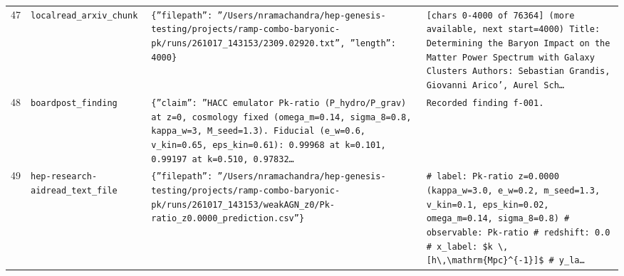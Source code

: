 \documentclass[11pt,a4paper]{article}
\begin{document}
\begin{longtable}{@{}p{}p{}p{}p{}@{}}
47 & \texttt{local}\newline\texttt{read\_\allowbreak{}arxiv\_\allowbreak{}chunk} & \texttt{\{''filepath'':\allowbreak{} ''/\allowbreak{}Users/\allowbreak{}nramachandra/\allowbreak{}hep-genesis-testing/\allowbreak{}projects/\allowbreak{}ramp-combo-baryonic-pk/\allowbreak{}runs/\allowbreak{}261017\_\allowbreak{}143153/\allowbreak{}2309.02920.txt'',\allowbreak{} ''length'':\allowbreak{} 4000\}\allowbreak{}} & \texttt{[chars 0-4000 of 76364]\allowbreak{} (more available,\allowbreak{} next start=\allowbreak{}4000)\allowbreak{}  Title:\allowbreak{} Determining the Baryon Impact on the Matter Power Spectrum with Galaxy Clusters Authors:\allowbreak{} Sebastian Grandis,\allowbreak{} Giovanni Arico',\allowbreak{} Aurel Sch\ldots{}\allowbreak{}} \\
48 & \texttt{board}\newline\texttt{post\_\allowbreak{}finding} & \texttt{\{''claim'':\allowbreak{} ''HACC emulator Pk-ratio (P\_\allowbreak{}hydro/\allowbreak{}P\_\allowbreak{}grav)\allowbreak{} at z=\allowbreak{}0,\allowbreak{} cosmology fixed (omega\_\allowbreak{}m=\allowbreak{}0.14,\allowbreak{} sigma\_\allowbreak{}8=\allowbreak{}0.8,\allowbreak{} kappa\_\allowbreak{}w=\allowbreak{}3,\allowbreak{} M\_\allowbreak{}seed=\allowbreak{}1.3)\allowbreak{}. Fiducial (e\_\allowbreak{}w=\allowbreak{}0.6,\allowbreak{} v\_\allowbreak{}kin=\allowbreak{}0.65,\allowbreak{} eps\_\allowbreak{}kin=\allowbreak{}0.61)\allowbreak{}:\allowbreak{} 0.99968 at k=\allowbreak{}0.101,\allowbreak{} 0.99197 at k=\allowbreak{}0.510,\allowbreak{} 0.97832\ldots{}\allowbreak{}} & \texttt{Recorded finding f-001.} \\
49 & \texttt{hep-research-aid}\newline\texttt{read\_\allowbreak{}text\_\allowbreak{}file} & \texttt{\{''filepath'':\allowbreak{} ''/\allowbreak{}Users/\allowbreak{}nramachandra/\allowbreak{}hep-genesis-testing/\allowbreak{}projects/\allowbreak{}ramp-combo-baryonic-pk/\allowbreak{}runs/\allowbreak{}261017\_\allowbreak{}143153/\allowbreak{}weakAGN\_\allowbreak{}z0/\allowbreak{}Pk-ratio\_\allowbreak{}z0.0000\_\allowbreak{}prediction.csv''\}\allowbreak{}} & \texttt{\# label:\allowbreak{} Pk-ratio z=\allowbreak{}0.0000 (kappa\_\allowbreak{}w=\allowbreak{}3.0,\allowbreak{} e\_\allowbreak{}w=\allowbreak{}0.2,\allowbreak{} m\_\allowbreak{}seed=\allowbreak{}1.3,\allowbreak{} v\_\allowbreak{}kin=\allowbreak{}0.1,\allowbreak{} eps\_\allowbreak{}kin=\allowbreak{}0.02,\allowbreak{} omega\_\allowbreak{}m=\allowbreak{}0.14,\allowbreak{} sigma\_\allowbreak{}8=\allowbreak{}0.8)\allowbreak{} \# observable:\allowbreak{} Pk-ratio \# redshift:\allowbreak{} 0.0 \# x\_\allowbreak{}label:\allowbreak{} \$k \textbackslash{}\allowbreak{},\allowbreak{} [h\textbackslash{}\allowbreak{},\allowbreak{}\textbackslash{}\allowbreak{}mathrm\{Mpc\}\allowbreak{}\textasciicircum{}\allowbreak{}\{-1\}\allowbreak{}]\allowbreak{}\$ \# y\_\allowbreak{}la\ldots{}\allowbreak{}} \\

\end{longtable}
\end{document}
